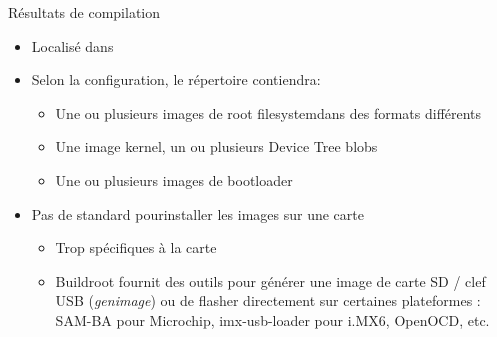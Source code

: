 \begin{frame}{Résultats de compilation}
  \begin{itemize}
  \item Localisé dans 
  \item Selon la configuration, le répertoire contiendra:
    \begin{itemize}
    \item Une ou plusieurs images de root filesystemdans des formats différents
    \item Une image kernel, un ou plusieurs Device Tree blobs
    \item Une ou plusieurs images de bootloader
    \end{itemize}
  \item Pas de standard pourinstaller les images sur une carte
    \begin{itemize}
    \item Trop spécifiques à la carte
    \item Buildroot fournit des outils pour générer une image de carte SD / clef USB
      ({\em genimage}) ou de flasher directement sur certaines plateformes :
      SAM-BA pour Microchip, imx-usb-loader pour i.MX6, OpenOCD, etc.
    \end{itemize}
  \end{itemize}
\end{frame}
